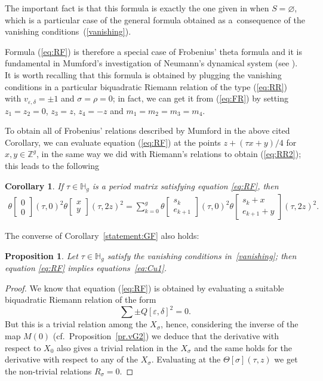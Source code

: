 \documentclass[pdftex]{sigma}
\numberwithin{equation}{section}
\newtheorem{Corollary}[Theorem]{Corollary}
\newtheorem{Proposition}[Theorem]{Proposition}
{ \theoremstyle{definition}
\newtheorem{Remark}[Theorem]{Remark} }
\newcommand{\de}{\delta}
\newcommand{\ep}{\varepsilon}
\newcommand{\HH}{{\mathbb{H}}}
\newcommand{\ZZ}{{\mathbb{Z}}}
\def\ZZ{{\mathbb Z}}
\def\t{\theta}
\def\s{\sigma}
\def\T{\Theta}
\def\tt#1#2{{\t\left[\begin{matrix}{#1}\\ {#2}\end{matrix}\right]}}
\begin{document}
\begin{Remark} The important fact is that this formula is exactly the one given in \cite[Corollary~7.5, p.~113]{mu} when $S=\varnothing$, which is a particular case of the general formula obtained as a~consequence of the vanishing conditions~(\ref{vanishing}).
 \end{Remark}

Formula (\ref{eq:RF}) is therefore a special case of Frobenius' theta formula and it is fundamental in Mumford's investigation of Neumann's dynamical system (see \cite[Lemma~9.7]{mu}). It is worth recalling that this formula is obtained by plugging the vanishing conditions in a particular biquadratic Riemann relation of the type (\ref{eq:RR}) with $v_{\ep,\de}=\pm 1$ and $\s=\rho=0$; in fact, we can get it from (\ref{eq:FR}) by setting $z_1=z_2=0$, $z_3=z$, $z_4=-z$ and $ m_1=m_2=m_3=m_4.$

To obtain all of Frobenius' relations described by Mumford in the above cited Corollary, we can evaluate equation (\ref{eq:RF}) at the points $z+(\tau x+y)/4$ for $x,y \in\ZZ^g$, in the same way we did with Riemann's relations to obtain (\ref{eq:RR2}); this leads to the following
\begin{Corollary} If $\tau\in \HH_g$ is a period matrix
satisfying equation \eqref{eq:RF}, then
\begin{gather}\label{eq:RF2}
 \tt{0}{0}(\tau,0)^2\tt{x}{y }(\tau, 2z)^2 =\sum_{k=0}^g \tt{s_k}{e_{k+1}}(\tau,0)^2\tt{s_k+x}{e_{k+1}+y }(\tau, 2z)^2 .
\end{gather}
\end{Corollary}

The converse of Corollary~\ref{statement:GF} also holds:

 \begin{Proposition}\label{statement:FG} Let $\tau\in\HH_g$ satisfy the vanishing conditions in~\eqref{vanishing}; then equation \eqref{eq:RF} implies equations~\eqref{eq:Cu1}.
 \end{Proposition}
 \begin{proof}We know that equation (\ref{eq:RF}) is obtained by evaluating a suitable biquadratic Riemann relation of the form
 \[
\sum \pm Q[\ep, \de]^2 =0.
\]
But this is a trivial relation among the $X_{\s}$, hence, considering the inverse of the map $M(0)$ (cf.\ Proposition~\ref{pr.vG2}) we deduce that the derivative with respect to $X_0$ also gives a trivial relation in the $X_{\s}$ and the same holds for the derivative with respect to any of the $X_{\s}$. Evaluating at the $\T[\s](\tau, z)$ we get the non-trivial relations $R_{\s}=0$.
\end{proof}
\end{document}
